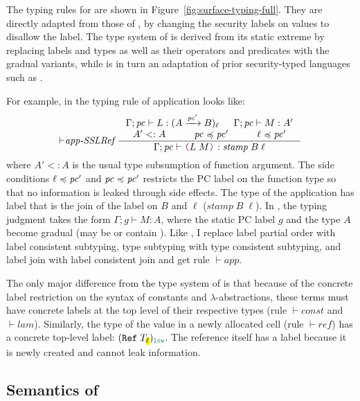The typing rules for \Surface are shown in Figure~\ref{fig:surface-typing-full}.
They are directly adapted from those of \GSLRef, by changing the security labels
on values to disallow the \unk label. The type system of \GSLRef is derived from
its static extreme \SSLRef by replacing labels and types as well as their
operators and predicates with the gradual variants, while \SSLRef is in turn an
adaptation of prior security-typed languages such as \textcite{Fennell:2013ab,
  heintze1998slam, zdancewic2002programming}.

For example, in \SSLRef the typing rule of application looks like:
\begin{equation*}
{\vdash}\textit{app-SSLRef}~
\inference{\Gamma; \pc \vdash L : (\Fun{A}{\pc'}{B})_\ell & \Gamma; \pc \vdash M : A' \\
  A' <: A & \pc \preccurlyeq \pc' & \ell \preccurlyeq \pc'}
{\Gamma; \pc \vdash \app{L}{M}{} : \mathit{stamp}\;B\;\ell}
\end{equation*}
where $A' <: A$ is the usual type subsumption of function argument. The side
conditions $\ell \preccurlyeq \mathit{pc}'$ and $\mathit{pc} \preccurlyeq \mathit{pc}'$ restricts the PC
label on the function type so that no information is leaked through side
effects. The type of the application has label that is the join of the label on
$B$ and $\ell$ ($\mathit{stamp}\;B\;\ell$). In \Surface, the typing judgment
takes the form $\Gamma ; g \vdash M : A$, where the static PC label $g$ and the
type $A$ become gradual (may be or contain \unk). Like \GSLRef, I replace label
partial order with label consistent subtyping, type subtyping with type
consistent subtyping, and label join with label consistent join and get rule
${\vdash}\mathit{app}$.

The only major difference from the type system of \GSLRef is that because of the
concrete label restriction on the syntax of constants and
$\lambda$-abstractions, these terms must have concrete labels at the top level
of their respective types (rule ${\vdash}\mathit{const}$ and
${\vdash}\mathit{lam}$). Similarly, the type of the value in a newly allocated
cell (rule ${\vdash}\mathit{ref}$) has a concrete top-level label:
$(\Refer{T_{\text{\hl{$\ell$}}}})_{\low}$. The reference itself has a \low label
because it is newly created and cannot leak information.

\subsection{Semantics of \Surface}
\label{sec:surface-semantics}

